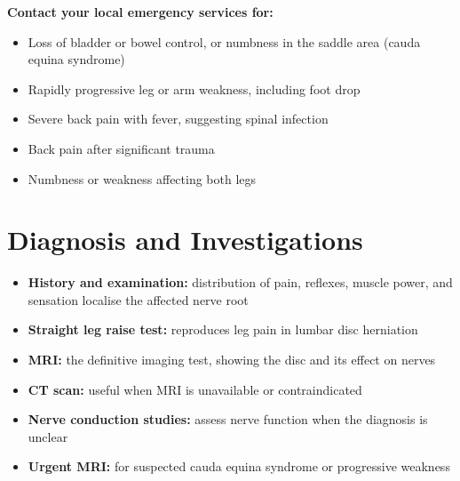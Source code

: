 \textbf{Contact your local emergency services for:}
\begin{itemize}
    \item Loss of bladder or bowel control, or numbness in the saddle area (cauda equina syndrome)
    \item Rapidly progressive leg or arm weakness, including foot drop
    \item Severe back pain with fever, suggesting spinal infection
    \item Back pain after significant trauma
    \item Numbness or weakness affecting both legs
\end{itemize}

\section*{Diagnosis and Investigations}
\begin{itemize}
    \item \textbf{History and examination:} distribution of pain, reflexes, muscle power, and sensation localise the affected nerve root
    \item \textbf{Straight leg raise test:} reproduces leg pain in lumbar disc herniation
    \item \textbf{MRI:} the definitive imaging test, showing the disc and its effect on nerves
    \item \textbf{CT scan:} useful when MRI is unavailable or contraindicated
    \item \textbf{Nerve conduction studies:} assess nerve function when the diagnosis is unclear
    \item \textbf{Urgent MRI:} for suspected cauda equina syndrome or progressive weakness
\end{itemize}


